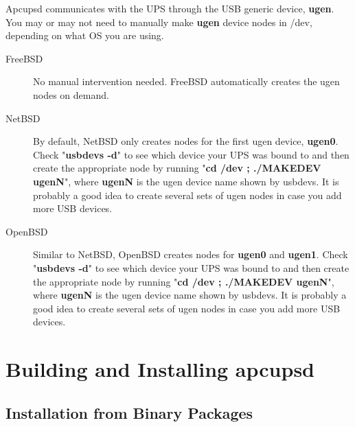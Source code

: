 Apcupsd communicates with the UPS through the USB generic device, {\bf ugen}.
You may or may not need to manually make {\bf ugen} device nodes in /dev, 
depending on what OS you are using.  

\begin{description}
\item [FreeBSD]
No manual intervention needed. FreeBSD automatically creates the ugen
nodes on demand.

\item [NetBSD]
By default, NetBSD only creates nodes for the first ugen device, {\bf ugen0}.
Check "{\bf usbdevs -d}" to see which device your UPS was bound to and then
create the appropriate node by running "{\bf cd /dev ; ./MAKEDEV ugenN}",
where {\bf ugenN} is the ugen device name shown by usbdevs. It is probably
a good idea to create several sets of ugen nodes in case you add more USB
devices.

\item [OpenBSD]
Similar to NetBSD, OpenBSD creates nodes for {\bf ugen0} and {\bf ugen1}.
Check "{\bf usbdevs -d}" to see which device your UPS was bound to and then
create the appropriate node by running "{\bf cd /dev ; ./MAKEDEV ugenN}",
where {\bf ugenN} is the ugen device name shown by usbdevs. It is probably
a good idea to create several sets of ugen nodes in case you add more USB
devices.
\end{description}

\label{Building-and-Installing-apcupsd}

\section*{Building and Installing apcupsd}

\label{index-Building-18}
\label{index-Installing-19}

\label{Installation-from-Binary-Packages}

\subsection*{Installation from Binary Packages}

\label{Red-Hat-Linux}

